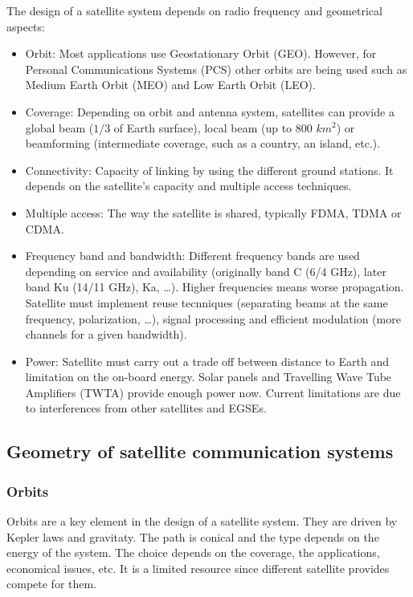 \documentclass[
	12pt,
	twoside
]{book}
\begin{document}
The design of a satellite system depends on radio frequency and geometrical aspects:
\begin{itemize}
	\item Orbit: Most applications use Geostationary Orbit (GEO). However, for Personal Communications Systems (PCS) other orbits are being used such as Medium Earth Orbit (MEO) and Low Earth Orbit (LEO).
	\item Coverage: Depending on orbit and antenna system, satellites can provide a global beam ($1/3$ of Earth surface), local beam (up to 800 $km^2$) or beamforming (intermediate coverage, such as a country, an island, etc.).
	\item Connectivity: Capacity of linking by using the different ground stations. It depends on the satellite’s capacity and multiple access techniques.
	\item Multiple access: The way the satellite is shared, typically FDMA, TDMA or CDMA.
	\item Frequency band and bandwidth: Different frequency bands are used depending on service and availability (originally band C (6/4 GHz), later band Ku (14/11 GHz), Ka, \ldots). Higher frequencies means worse propagation. Satellite must implement reuse tecnniques (separating beams at the same frequency, polarization, \ldots), signal processing and efficient modulation (more channels for a given bandwidth).
	\item Power: Satellite must carry out a trade off between distance to Earth and limitation on the on-board energy. Solar panels and Travelling Wave Tube Amplifiers (TWTA) provide enough power now. Current limitations are due to interferences from other satellites and EGSEs.
\end{itemize}

\subsection{Geometry of satellite communication systems}

\subsubsection{Orbits}

Orbits are a key element in the design of a satellite system. They are driven by Kepler laws and gravitaty. The path is conical and the type depends on the energy of the system. The choice depends on the coverage, the applications, economical issues, etc. It is a limited resource since different satellite provides compete for them.
\end{document}
